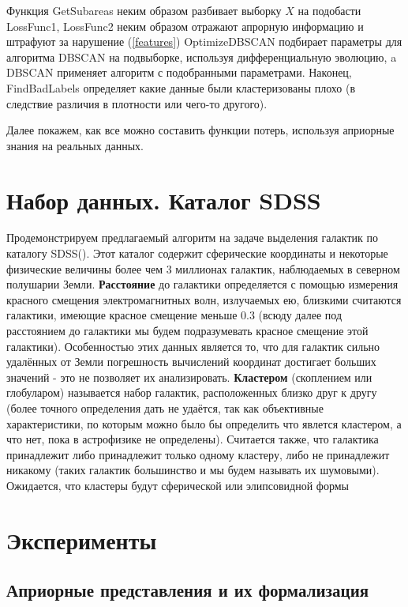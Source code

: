 \documentclass[12pt,fleqn]{article}
\begin{document}
Функция GetSubareas  неким образом разбивает выборку $X$ на подобасти
LossFunc1, LossFunc2 неким образом отражают апрорную информацию и штрафуют за нарушение (\ref{features}) 
OptimizeDBSCAN подбирает параметры для алгоритма DBSCAN на подвыборке, используя дифференциальную эволюцию, a DBSCAN применяет алгоритм с подобранными параметрами. Наконец, FindBadLabels определяет какие данные были кластеризованы плохо (в следствие различия в плотности или чего-то другого).

Далее покажем, как все можно составить функции потерь, используя априорные знания на реальных данных.

\section{Набор данных. Каталог SDSS}

Продемонстрируем предлагаемый алгоритм на задаче выделения галактик по каталогу SDSS(\cite{SDSS}). Этот каталог содержит сферические координаты и некоторые физические величины более чем 3 миллионах галактик, наблюдаемых в северном полушарии Земли. \textbf{Расстояние} до галактики определяется с помощью измерения красного смещения электромагнитных волн, излучаемых ею, близкими считаются галактики, имеющие красное смещение меньше 0.3 (всюду далее под расстоянием до галактики мы будем подразумевать красное смещение этой галактики). Особенностью этих данных является то, что для галактик сильно удалённых от Земли погрешность вычислений координат достигает больших значений - это не позволяет их анализировать. \textbf{Кластером} (скоплением или глобуларом) называется набор галактик, расположенных близко друг к другу (более точного определения дать не удаётся, так как объективные характеристики, по которым можно было бы определить что явлется кластером, а что нет, пока в астрофизике не определены). Считается также, что галактика принадлежит либо принадлежит только одному кластеру, либо не принадлежит никакому (таких галактик большинство и мы будем называть их шумовыми).
Ожидается, что кластеры будут сферической или элипсовидной формы

\section{Эксперименты}
\subsection{Априорные представления и их формализация}
\end{document}
